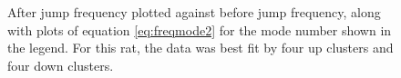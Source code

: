 \documentclass[twocolumn, prX]{revtex4}
\begin{document}
\begin{figure}
\begin{center}

\caption{\label{fig:jumps}After jump frequency plotted against before jump frequency, along with plots of equation \ref{eq:freqmode2} for the mode number shown in the legend. For this rat, the data was best fit by four up clusters and four down clusters.} \end{center}
\end{figure}
\end{document}

